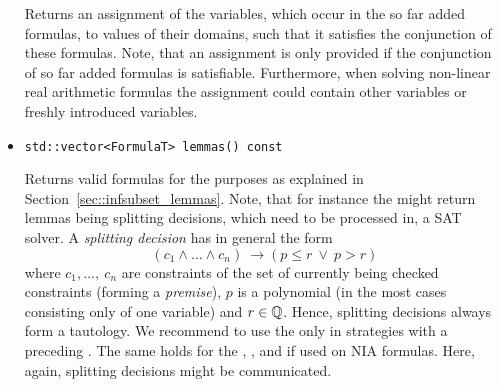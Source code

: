 \begin{itemize}
    	Returns an assignment of the variables, which occur in the so far added
        formulas, to values of their domains, such that it satisfies the 
        conjunction of these formulas. Note, that an assignment is only provided if the conjunction of so far added
        formulas is satisfiable. Furthermore, when solving non-linear real arithmetic 
        formulas the assignment could contain other variables or freshly introduced
        variables.
    \item \begin{verbatim}std::vector<FormulaT> lemmas() const\end{verbatim}
    Returns valid formulas for the purposes as explained in Section~\ref{sec::infsubset_lemmas}. Note, 
    that for instance the \icpModule might return lemmas being splitting decisions, which need to be processed in, \eg a SAT solver. A \emph{splitting decision} has in general the form
    \[(c_1 \land \ldots \land c_n)\ \rightarrow (p \leq r\ \lor\ p > r)\]
    where $c_1,\ldots,\ c_n$ are constraints of the set of currently being checked constraints (forming a \emph{premise}), $p$ is a polynomial (in the most cases consisting only of one variable) and $r\in\mathbb{Q}$. Hence, splitting decisions always form a tautology. We recommend to use the \icpModule only in strategies with a preceding \satModule. The same holds for the \simplexModule, \vsModule, and \cadModule if used on NIA formulas. Here, again, splitting decisions might be communicated.
\end{itemize}

